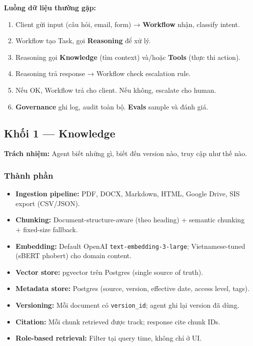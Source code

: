 \documentclass[11pt,a4paper]{article}
\begin{document}
\textbf{Luồng dữ liệu thường gặp:}

\begin{enumerate}
\item Client gửi input (câu hỏi, email, form) → \textbf{Workflow} nhận, classify intent.
\item Workflow tạo Task, gọi \textbf{Reasoning} để xử lý.
\item Reasoning gọi \textbf{Knowledge} (tìm context) và/hoặc \textbf{Tools} (thực thi action).
\item Reasoning trả response → Workflow check escalation rule.
\item Nếu OK, Workflow trả cho client. Nếu không, escalate cho human.
\item \textbf{Governance} ghi log, audit toàn bộ. \textbf{Evals} sample và đánh giá.
\end{enumerate}

\subsection{Khối 1 — Knowledge}

\textbf{Trách nhiệm:} Agent biết những gì, biết đến version nào, truy cập như thế nào.

\subsubsection*{Thành phần}
\begin{itemize}
\item \textbf{Ingestion pipeline:} PDF, DOCX, Markdown, HTML, Google Drive, SIS export (CSV/JSON).
\item \textbf{Chunking:} Document-structure-aware (theo heading) + semantic chunking + fixed-size fallback.
\item \textbf{Embedding:} Default OpenAI \texttt{text-embedding-3-large}; Vietnamese-tuned (sBERT phobert) cho domain content.
\item \textbf{Vector store:} pgvector trên Postgres (single source of truth).
\item \textbf{Metadata store:} Postgres (source, version, effective date, access level, tags).
\item \textbf{Versioning:} Mỗi document có \texttt{version\_id}; agent ghi lại version đã dùng.
\item \textbf{Citation:} Mỗi chunk retrieved được track; response cite chunk IDs.
\item \textbf{Role-based retrieval:} Filter tại query time, không chỉ ở UI.
\end{itemize}
\end{document}
